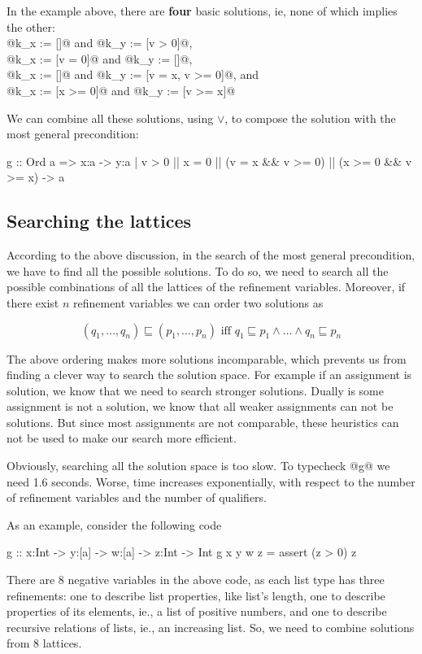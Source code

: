 \documentclass[10pt,a4paper]{article}
\begin{document}
In the example above, there are \textbf{four} basic solutions, ie, none of which 
implies the other:\\
@k_x := []@ and @k_y := [v > 0]@,\\
@k_x := [v = 0]@ and @k_y := []@,\\
@k_x := []@ and @k_y := [v = x, v >= 0]@, and\\
@k_x := [x >= 0]@ and @k_y := [v >= x]@

We can combine all these solutions, using $\lor$,
to compose the solution with the most general precondition:


\begin{code}
g :: Ord a 
  => x:a 
  -> {y:a | v > 0 || x = 0 || (v = x && v >= 0) || (x >= 0 && v >= x)}
  -> a
\end{code}


\subsection*{Searching the lattices}
According to the above discussion, 
in the search of the most general precondition,
we have to find all the possible solutions.
To do so, we need to search all the possible combinations
of all the lattices of the refinement variables.
%
Moreover,
if there exist $n$ refinement variables 
we can order two solutions as

$$(q_1, \dots, q_n) \sqsubseteq (p_1, \dots, p_n)
\text{ iff }
q_1\sqsubseteq p_1 \land \dots \land q_n\sqsubseteq p_n $$

The above ordering makes more solutions incomparable, 
which prevents us from 
finding a clever way to search the solution space.
%
For example if an assignment is solution, we know that
we need to search stronger solutions.
Dually is some assignment is not a solution, 
we know that all weaker assignments can not be solutions.
But since most assignments are not comparable,
these heuristics can not be used to make our search more efficient.

Obviously, searching all the solution space 
is too slow. 
To typecheck @g@ we need 1.6 seconds.
%
Worse, time increases exponentially, with respect
to the number of refinement variables 
and the number of qualifiers.

As an example, consider the following code
\begin{code}
g :: x:Int -> y:[a] -> w:[a] -> z:Int -> Int
g x y w z = assert (z > 0) z
\end{code}

There are 8 negative variables in the above code,
as each list type has three refinements:
one to describe list properties, like list's length,
one to describe properties of its elements, ie., a list of positive numbers,
and one to describe recursive relations of lists, ie., an increasing list. 
So, we need to combine solutions from 8 lattices.
%
\end{document}
